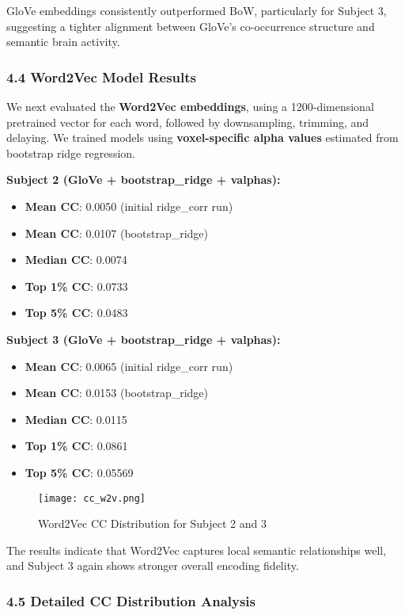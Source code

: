 \documentclass[11pt]{article}
\begin{document}
GloVe embeddings consistently outperformed BoW, particularly for Subject
3, suggesting a tighter alignment between GloVe's co-occurrence
structure and semantic brain activity.

\hypertarget{word2vec-model-results}{%
\subsubsection{4.4 Word2Vec Model
Results}\label{word2vec-model-results}}

We next evaluated the \textbf{Word2Vec embeddings}, using a
1200-dimensional pretrained vector for each word, followed by
downsampling, trimming, and delaying. We trained models using
\textbf{voxel-specific alpha values} estimated from bootstrap ridge
regression.

\textbf{Subject 2 (GloVe + bootstrap\_ridge + valphas):}

\begin{itemize}
\item
  \textbf{Mean CC}: 0.0050 (initial ridge\_corr run)
\item
  \textbf{Mean CC}: 0.0107 (bootstrap\_ridge)
\item
  \textbf{Median CC}: 0.0074
\item
  \textbf{Top 1\% CC}: 0.0733
\item
  \textbf{Top 5\% CC}: 0.0483
\end{itemize}

\textbf{Subject 3 (GloVe + bootstrap\_ridge + valphas):}

\begin{itemize}
\item
  \textbf{Mean CC}: 0.0065 (initial ridge\_corr run)
\item
  \textbf{Mean CC}: 0.0153 (bootstrap\_ridge)
\item
  \textbf{Median CC}: 0.0115
\item
  \textbf{Top 1\% CC}: 0.0861
\item
  \textbf{Top 5\% CC}: 0.05569
\end{itemize}

\begin{figure}
\centering
\texttt{[image: cc\_w2v.png]}
\caption{Word2Vec CC Distribution for Subject 2 and 3}
\end{figure}

The results indicate that Word2Vec captures local semantic relationships
well, and Subject 3 again shows stronger overall encoding fidelity.

\hypertarget{detailed-cc-distribution-analysis}{%
\subsubsection{4.5 Detailed CC Distribution
Analysis}\label{detailed-cc-distribution-analysis}}
\end{document}

